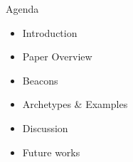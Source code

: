 \begin{frame}{Agenda}
    \begin{itemize}
        \item Introduction
        \item Paper Overview
        \item Beacons
        \item Archetypes \& Examples
        \item Discussion
        \item Future works
    \end{itemize}
\end{frame}
